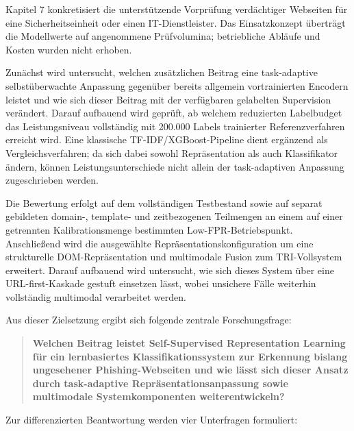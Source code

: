 Kapitel 7 konkretisiert die unterstützende Vorprüfung verdächtiger Webseiten für eine
Sicherheitseinheit oder einen IT-Dienstleister. Das Einsatzkonzept überträgt die Modellwerte
auf angenommene Prüfvolumina; betriebliche Abläufe und Kosten wurden nicht erhoben.

Zunächst wird untersucht, welchen zusätzlichen Beitrag eine task-adaptive selbstüberwachte
Anpassung gegenüber bereits allgemein vortrainierten Encodern leistet und wie sich dieser
Beitrag mit der verfügbaren gelabelten Supervision verändert. Darauf aufbauend wird geprüft,
ab welchem reduzierten Labelbudget das Leistungsniveau vollständig mit 200.000 Labels
trainierter Referenzverfahren erreicht wird. Eine klassische TF-IDF/XGBoost-Pipeline dient
ergänzend als Vergleichsverfahren; da sich dabei sowohl Repräsentation als auch Klassifikator
ändern, können Leistungsunterschiede nicht allein der task-adaptiven Anpassung zugeschrieben
werden.

Die Bewertung erfolgt auf dem vollständigen Testbestand sowie auf separat gebildeten domain-,
template- und zeitbezogenen Teilmengen an einem auf einer getrennten Kalibrationsmenge
bestimmten Low-FPR-Betriebspunkt. Anschließend wird die ausgewählte
Repräsentationskonfiguration um eine strukturelle DOM-Repräsentation und multimodale Fusion
zum TRI-Vollsystem erweitert. Darauf aufbauend wird untersucht, wie sich dieses System über
eine URL-first-Kaskade gestuft einsetzen lässt, wobei unsichere Fälle weiterhin vollständig
multimodal verarbeitet werden.

Aus dieser Zielsetzung ergibt sich folgende zentrale Forschungsfrage:

\begin{quote}
\textbf{Welchen Beitrag leistet Self-Supervised Representation Learning für ein lernbasiertes
Klassifikationssystem zur Erkennung bislang ungesehener Phishing-Webseiten und wie lässt sich
dieser Ansatz durch task-adaptive Repräsentationsanpassung sowie multimodale
Systemkomponenten weiterentwickeln?}
\end{quote}

Zur differenzierten Beantwortung werden vier Unterfragen formuliert:

